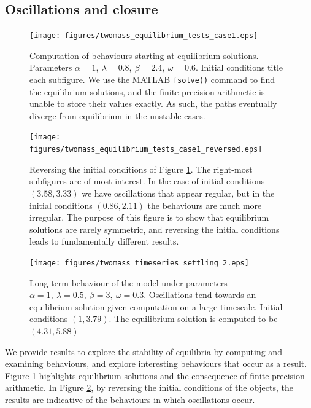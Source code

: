 \documentclass{report}
\begin{document}
\subsection{Oscillations and closure}

\begin{figure}
    \centering
    \texttt{[image: figures/twomass\_equilibrium\_tests\_case1.eps]}
    \caption{
        Computation of behaviours starting at equilibrium solutions.
        Parameters \(\alpha=1,~\lambda=0.8,~\beta=2.4,~\omega=0.6\).
        Initial conditions title each subfigure.
        We use the MATLAB \texttt{fsolve()} command to find the equilibrium solutions,
        and the finite precision arithmetic is unable to store their values exactly.
        As such, the paths eventually diverge from equilibrium in the unstable cases.
    }
    \label{fig:twomass_equilibria_timeseries}
\end{figure}

\begin{figure}
    \centering
    \texttt{[image: figures/twomass\_equilibrium\_tests\_case1\_reversed.eps]}
    \caption{
        Reversing the initial conditions of Figure \ref{fig:twomass_equilibria_timeseries}.
        The right-most subfigures are of most interest.
        In the case of initial conditions \((3.58,3.33)\) we have oscillations that appear regular,
        but in the initial conditions \((0.86,2.11)\) the behaviours are much more irregular.
        The purpose of this figure is to show that equilibrium solutions are rarely symmetric,
        and reversing the initial conditions leads to fundamentally different results.
    }
    \label{fig:twomass_equilibria_timeseries_2}
\end{figure}

\begin{figure}
    \centering
    \texttt{[image: figures/twomass\_timeseries\_settling\_2.eps]}
    \caption{
        Long term behaviour of the model under parameters \(\alpha=1,~\lambda=0.5,~\beta=3,~\omega=0.3\).
        Oscillations tend towards an equilibrium solution given computation on a large timescale.
        Initial conditions \((1,3.79)\).
        The equilibrium solution is computed to be $(4.31,5.88)$
    }
    \label{fig:twomass_timeseries_settling}
\end{figure}

We provide results to explore the stability of equilibria by computing and examining behaviours,
and explore interesting behaviours that occur as a result.
Figure \ref{fig:twomass_equilibria_timeseries} highlights equilibrium solutions and the consequence of finite precision arithmetic.
In Figure \ref{fig:twomass_equilibria_timeseries_2}, by reversing the initial conditions of the objects,
the results are indicative of the behaviours in which oscillations occur.
\end{document}
